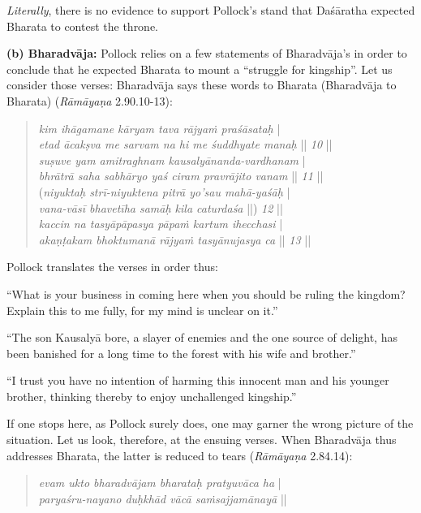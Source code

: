 {\sl Literally}, there is no evidence to support Pollock’s stand that Daśāratha expected Bharata to contest the throne. 


\noindent
\textbf{(b) Bharadvāja:} Pollock relies on a few statements of Bharadvāja’s in order to conclude that he expected Bharata to mount a “struggle for kingship”. Let us consider those verses: Bharadvāja says these words to Bharata (Bharadvāja to Bharata) ({\sl Rāmāyaṇa} 2.90.10-13):\\[-21pt] 
\begin{quote}
{{\sl kim ihāgamane kāryam tava rājyaṁ praśāsataḥ}} |\\
{{\sl etad ācakṣva me sarvam na hi me śuddhyate manaḥ}} || {\sl 10} ||\\
{\sl suṣuve yam amitraghnam kausalyānanda-vardhanam} |\\
{\sl bhrātrā saha sabhāryo yaś ciram pravrājito vanam} || {\sl 11} ||\\
({\sl niyuktaḥ strī-niyuktena pitrā yo’sau mahā-yaśāḥ} |\\
{\sl vana-vāsī bhavetīha samāḥ kila caturdaśa} ||) {\sl 12} ||\\
{\sl kaccin na tasyāpāpasya pāpaṁ kartum ihecchasi} |\\
{\sl akaṇṭakam bhoktumanā rājyaṁ tasyānujasya ca} || {\sl 13} ||
\end{quote}

Pollock translates the verses in order thus:

\begin{myquote}
“What is your business in coming here when you should be ruling the kingdom? Explain this to me fully, for my mind is unclear on it.” 

“The son Kausalyā bore, a slayer of enemies and the one source of delight, has been banished for a long time to the forest with his wife and brother.”			 

“I trust you have no intention of harming this innocent man and his younger brother, thinking thereby to enjoy unchallenged kingship.”
\end{myquote}

If one stops here, as Pollock surely does, one may garner the wrong picture of the situation. Let us look, therefore, at the ensuing verses. When Bharadvāja thus addresses Bharata, the latter is reduced to tears ({\sl Rāmāyaṇa} 2.84.14):
\begin{quote}
{{\sl evam ukto bharadvājam bharataḥ pratyuvāca ha}} |\\
{\sl paryaśru-nayano duḥkhād vācā saṁsajjamānayā} || 
\end{quote}

